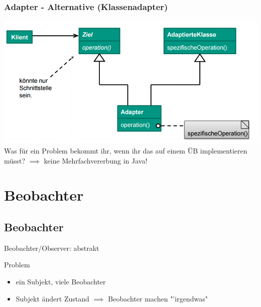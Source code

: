 \documentclass[18pt]{beamer}
\begin{document}
	\begin{frame}
		\frametitle{Adapter - Alternative (Klassenadapter)}
		\includegraphics[scale=0.45]{./pics/tut3/adap-cl.png} \linebreak \pause
		Was für ein Problem bekommt ihr, wenn ihr das auf einem ÜB implementieren müsst? \pause \linebreak
		$\implies$ keine Mehrfachvererbung in Java!
	\end{frame}

\section{Beobachter}
	\subsection{Beobachter}
	\begin{frame}{Beobachter/Observer: abstrakt}
		\begin{block}{Problem}
			\begin{itemize}
				\item ein Subjekt, viele Beobachter
				\item Subjekt ändert Zustand $\implies$ Beobachter machen "'irgendwas"
			\end{itemize}		
		\end{block}
	\end{frame}
\end{document}
